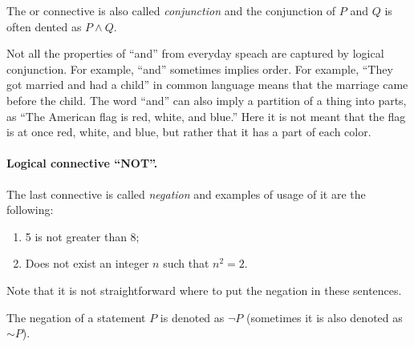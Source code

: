 The or connective is also called \emph{conjunction} and the conjunction of
$P$ and $Q$ is often dented as $P \land Q$.


\begin{warning}
  Not all the properties of ``and'' from everyday speach are captured by
  logical conjunction. For example, ``and'' sometimes implies order. For
  example, ``They got married and had a child'' in common language means that
  the marriage came before the child. The word ``and'' can also imply a
  partition of a thing into parts, as ``The American flag is red, white, and
  blue.'' Here it is not meant that the flag is at once red, white, and blue,
  but rather that it has a part of each color.
\end{warning}

\paragraph{Logical connective ``NOT''.}
The last connective is called \emph{negation} and examples of usage of it are
the following:
\begin{enumerate}
  \item 5 is not greater than 8;
  \item Does not exist an integer $n$ such that $n^2 = 2$.
\end{enumerate}

Note that it is not straightforward where to put the negation in these
sentences.

The negation of a statement $P$ is denoted as $\lnot P$ (sometimes it is also
denoted as $\sim P$).


